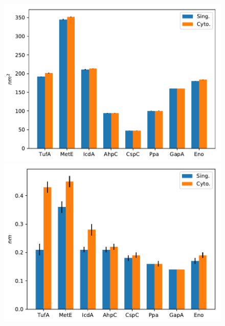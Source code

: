 \documentclass[journal=jacsat,manuscript=article]{achemso}
\begin{document}
\begin{figure}[H]
\includegraphics[scale=0.5]{sasa.pdf}
\includegraphics[scale=0.5]{rmsd.pdf}


\end{figure}
\end{document}
